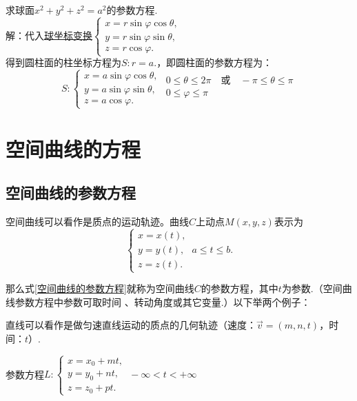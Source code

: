 \newpage
\example[球面的参数方程]
求球面$x^2+y^2+z^2=a^2$的参数方程.\\
解：代入\hyperref[球坐标]{\color{超链接}球坐标变换}$\displaystyle 	\begin{cases}
x=r\sin \varphi  \cos\theta,\\
y=r\sin \varphi  \sin\theta ,\\
z=r\cos \varphi.
\end{cases}$\\
得到圆柱面的柱坐标方程为$S:r =a.$，即圆柱面的参数方程为：
\begin{equation*}
S:	\begin{cases}
x=a\sin \varphi  \cos\theta,\\
y=a\sin \varphi  \sin\theta ,\\
z=a\cos \varphi.
\end{cases}
\begin{array}{l}
0 \le \theta \le 2\pi \quad \mbox{或} \quad -\pi \le \theta \le \pi \\ 
0 \le \varphi \le \pi\\ 
\end{array} 
\end{equation*}

\section{空间曲线的方程}
\subsection{空间曲线的参数方程}
\tdefination[空间曲线的参数方程]
空间曲线可以看作是质点的运动轨迹。曲线$C$上动点$M(x,y,z)$表示为
\begin{equation}
\begin{cases}
x=x(t),\\
y=y(t),\\
z=z(t).
\end{cases}
\, a \le t \le b.
\label{空间曲线的参数方程}
\end{equation}
\par 那么式\ref{空间曲线的参数方程}就称为空间曲线$C$的参数方程，其中$t$为参数.（空间曲线参数方程中参数可取时间 、转动角度或其它变量.）以下举两个例子：

\quad 直线可以看作是做匀速直线运动的质点的几何轨迹（速度：$\overrightarrow{v}=(m,n,t)$，时间：$t$）.
\par{\color{dy} 参数方程}\quad $\displaystyle L:\begin{cases}
x=x_0+mt,\\
y=y_0+nt,\\
z=z_0+pt.
\end{cases}\, -\infty  < t < +\infty $

